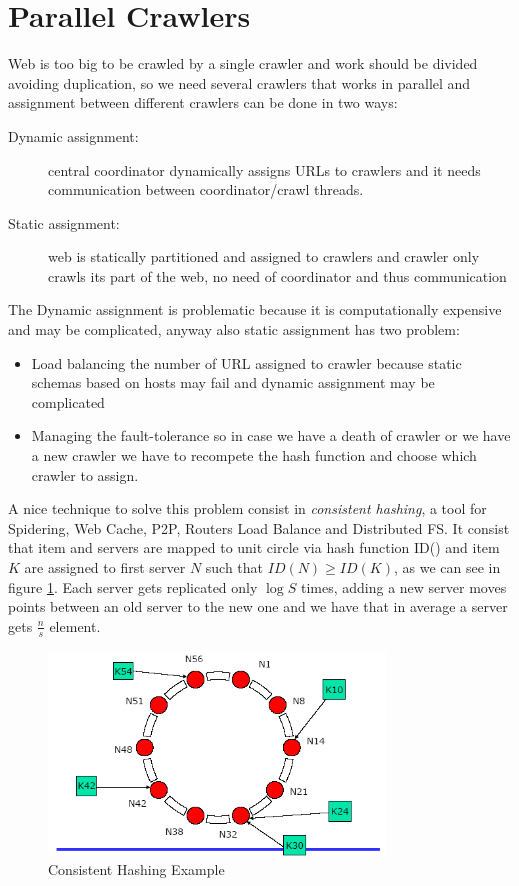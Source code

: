 \section{Parallel Crawlers}
    Web is too big to be crawled by a single crawler and work should be divided avoiding duplication, so we need several crawlers that works in parallel and assignment 
    between different crawlers can be done in two ways:
    \begin{description}
	    \item [Dynamic assignment: ] central coordinator dynamically assigns URLs to crawlers and it needs communication between coordinator/crawl threads.
	    \item [Static assignment: ] web is statically partitioned and assigned to crawlers and crawler only crawls its part of the web, no need of coordinator and thus communication
    \end{description}
    The Dynamic assignment is problematic because it is computationally expensive and may be complicated, anyway also static assignment has two problem:
    \begin{itemize}
	\item Load balancing the number of URL assigned to crawler because static schemas based on hosts may fail and dynamic assignment may be complicated
	\item Managing the fault-tolerance so in case we have a death of crawler or we have a new crawler we have to recompete the hash function and choose which crawler to assign.
    \end{itemize}
    A nice technique to solve this problem consist in \emph{consistent hashing}, a tool for Spidering, Web Cache, P2P, Routers Load Balance and Distributed FS.\newline
    It consist that item and servers are mapped to unit circle via hash function ID() and item $K$ are assigned to first server $N$ such that $ID(N) \geq ID(K)$, as we can 
    see in figure \ref{img:consistentHashing}.\newline
    Each server gets replicated only $\log S$ times, adding a new server moves points between an old server to the new one and we have that in average a server gets $\frac{n}{s}$ element.

    \begin{figure}
	\includegraphics[width=0.8\textwidth]{Images/consistentHashing}
	\caption{Consistent Hashing Example}
	\label{img:consistentHashing}
    \end{figure}


